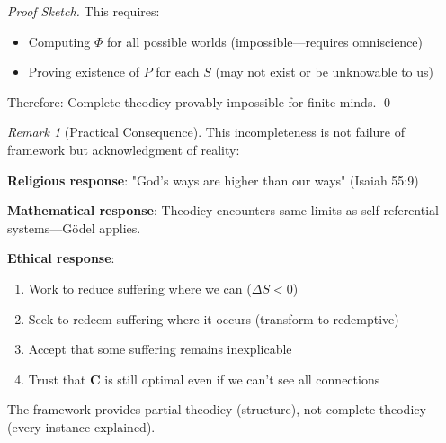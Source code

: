 \documentclass[11pt,a4paper]{article}
\theoremstyle{definition}
\theoremstyle{remark}
\newtheorem{remark}{Remark}[section]
\begin{document}
\begin{enumerate}
\begin{proof}[Proof Sketch]
This requires:
\begin{itemize}
    \item Computing \(\Phi\) for all possible worlds (impossible—requires omniscience)
    \item Proving existence of \(P\) for each \(S\) (may not exist or be unknowable to us)
\end{itemize}

Therefore: Complete theodicy provably impossible for finite minds. \qed
\end{proof}

\begin{remark}[Practical Consequence]
This incompleteness is not failure of framework but acknowledgment of reality:

\textbf{Religious response}: "God's ways are higher than our ways" (Isaiah 55:9)

\textbf{Mathematical response}: Theodicy encounters same limits as self-referential systems—Gödel applies.

\textbf{Ethical response}: 
\begin{enumerate}
    \item Work to reduce suffering where we can (\(\Delta S < 0\))
    \item Seek to redeem suffering where it occurs (transform to redemptive)
    \item Accept that some suffering remains inexplicable
    \item Trust that \(\mathbf{C}\) is still optimal even if we can't see all connections
\end{enumerate}

The framework provides partial theodicy (structure), not complete theodicy (every instance explained).
\end{remark}

\begin{figure}[H]
\centering
{}
\end{figure}
\end{enumerate}
\end{document}
